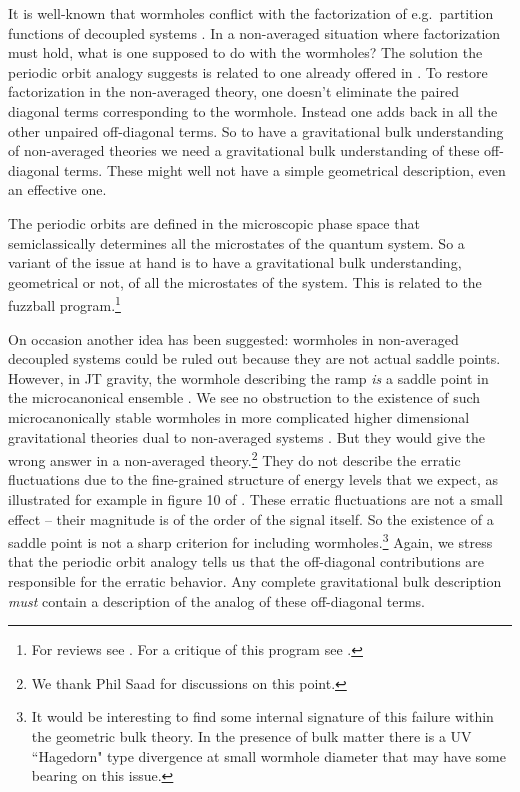 \documentclass[11pt]{article}
\numberwithin{equation}{section}
\begin{document}
It is well-known that wormholes conflict with the factorization of e.g.~partition functions of decoupled systems \cite{Maldacena:2004rf}.  In a non-averaged situation where factorization must hold, what is one supposed to do with the wormholes? The solution the periodic orbit analogy suggests is related to one already offered in \cite{Maldacena:2004rf}.    To restore factorization in the non-averaged theory, one doesn't eliminate the paired diagonal terms corresponding to the wormhole.  Instead one adds back in all the other unpaired off-diagonal terms.   So to have a gravitational  bulk understanding of non-averaged theories we need a gravitational  bulk  understanding of these off-diagonal terms. These might well not have a simple geometrical description, even an effective one.   

The periodic orbits are defined in the microscopic phase space that semiclassically determines all the microstates of the quantum system.   So a variant of the issue at hand is to have a gravitational bulk understanding, geometrical or not,  of all the microstates of the system.  This is related to  the fuzzball program.\footnote{For reviews see \cite{Mathur:2008nj,Bena:2013dka}. For a critique of this program see \cite{Raju:2018xue}.}   

On occasion another idea has been suggested: wormholes in non-averaged decoupled systems could be ruled out because they are not actual saddle points. However, in JT gravity, the wormhole describing the ramp \emph{is} a saddle point in the microcanonical ensemble \cite{Saad:2018bqo,Saad:2019pqd}.  We see no obstruction to the existence of such microcanonically stable wormholes in more complicated higher dimensional gravitational theories dual to non-averaged systems \cite{Saad:2018bqo}.  But they would give the wrong answer in a non-averaged theory.\footnote{We thank Phil Saad for discussions on this point.}  They do not describe the erratic fluctuations due to the fine-grained structure of energy levels  that we expect, as illustrated for example in figure 10 of \cite{Cotler:2016fpe}.  These erratic fluctuations are not a small effect -- their magnitude is of the order of the signal itself. So the existence of a saddle point is not a sharp criterion for including wormholes.\footnote{It would be interesting to find some internal signature of this failure within the geometric bulk theory.   In the presence of bulk matter there is a UV ``Hagedorn" type divergence at small wormhole diameter \cite{Saad:2019lba} that may have some bearing on this issue.}  Again, we stress that the periodic orbit analogy tells us that  the off-diagonal contributions are responsible for the erratic behavior.  Any complete gravitational bulk description \emph{must} contain a description of the analog of these  off-diagonal terms.  
\end{document}

